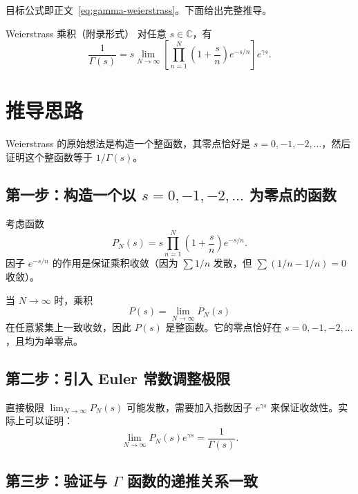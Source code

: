 目标公式即正文~\eqref{eq:gamma-weierstrass}。下面给出完整推导。

\begin{theorem}{Weierstrass 乘积（附录形式）}{}\label{thm:weierstrass-app}
对任意 \(s \in \mathbb{C}\)，有
\[
\frac{1}{\Gamma(s)} = s \lim_{N \to \infty} \left[ \prod_{n=1}^N \left(1 + \frac{s}{n}\right) e^{-s/n} \right] e^{\gamma s}.
\]
\end{theorem}

\section*{推导思路}

Weierstrass 的原始想法是构造一个整函数，其零点恰好是 \(s = 0, -1, -2, \dots\)，然后证明这个整函数等于 \(1/\Gamma(s)\)。

\subsection*{第一步：构造一个以 \(s=0,-1,-2,\dots\) 为零点的函数}

考虑函数
\[
P_N(s) = s \prod_{n=1}^N \left(1 + \frac{s}{n}\right) e^{-s/n}.
\]
因子 \(e^{-s/n}\) 的作用是保证乘积收敛（因为 \(\sum 1/n\) 发散，但 \(\sum (1/n - 1/n) = 0\) 收敛）。

当 \(N \to \infty\) 时，乘积
\[
P(s) = \lim_{N \to \infty} P_N(s)
\]
在任意紧集上一致收敛，因此 \(P(s)\) 是整函数。它的零点恰好在 \(s = 0, -1, -2, \dots\)，且均为单零点。

\subsection*{第二步：引入 Euler 常数调整极限}

直接极限 \(\lim_{N \to \infty} P_N(s)\) 可能发散，需要加入指数因子 \(e^{\gamma s}\) 来保证收敛性。实际上可以证明：
\[
\lim_{N \to \infty} P_N(s) e^{\gamma s} = \frac{1}{\Gamma(s)}.
\]

\subsection*{第三步：验证与 $\Gamma$ 函数的递推关系一致}

